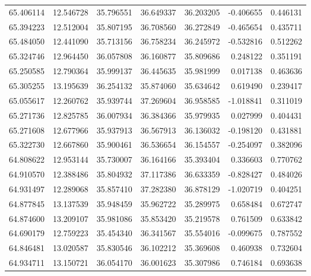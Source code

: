 \begin{tabular}{rrrrrrr}
 65.406114 &  12.546728 &         35.796551 &         36.649337 &         36.203205 & -0.406655 &  0.446131 \\
 65.394223 &  12.512004 &         35.807195 &         36.708560 &         36.272849 & -0.465654 &  0.435711 \\
 65.484050 &  12.441090 &         35.713156 &         36.758234 &         36.245972 & -0.532816 &  0.512262 \\
 65.324746 &  12.964450 &         36.057808 &         36.160877 &         35.809686 &  0.248122 &  0.351191 \\
 65.250585 &  12.790364 &         35.999137 &         36.445635 &         35.981999 &  0.017138 &  0.463636 \\
 65.305255 &  13.195639 &         36.254132 &         35.874060 &         35.634642 &  0.619490 &  0.239417 \\
 65.055617 &  12.260762 &         35.939744 &         37.269604 &         36.958585 & -1.018841 &  0.311019 \\
 65.271736 &  12.825785 &         36.007934 &         36.384366 &         35.979935 &  0.027999 &  0.404431 \\
 65.271608 &  12.677966 &         35.937913 &         36.567913 &         36.136032 & -0.198120 &  0.431881 \\
 65.322730 &  12.667860 &         35.900461 &         36.536654 &         36.154557 & -0.254097 &  0.382096 \\
 64.808622 &  12.953144 &         35.730007 &         36.164166 &         35.393404 &  0.336603 &  0.770762 \\
 64.910570 &  12.388486 &         35.804932 &         37.117386 &         36.633359 & -0.828427 &  0.484026 \\
 64.931497 &  12.289068 &         35.857410 &         37.282380 &         36.878129 & -1.020719 &  0.404251 \\
 64.877845 &  13.137539 &         35.948459 &         35.962722 &         35.289975 &  0.658484 &  0.672747 \\
 64.874600 &  13.209107 &         35.981086 &         35.853420 &         35.219578 &  0.761509 &  0.633842 \\
 64.690179 &  12.759223 &         35.454340 &         36.341567 &         35.554016 & -0.099675 &  0.787552 \\
 64.846481 &  13.020587 &         35.830546 &         36.102212 &         35.369608 &  0.460938 &  0.732604 \\
 64.934711 &  13.150721 &         36.054170 &         36.001623 &         35.307986 &  0.746184 &  0.693638 \\

\end{tabular}

